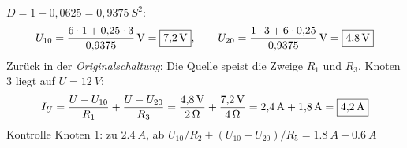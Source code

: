 \documentclass[11pt,a4paper]{article}
\begin{document}
\begin{loesung}
$D = 1 - 0{,}0625 = 0{,}9375\ \si{S^2}$:
\[
  U_{10} = \frac{6\cdot 1 + 0{,}25\cdot 3}{0{,}9375}\,\si{V} = \ergebnis{\SI{7.2}{V}},\qquad
  U_{20} = \frac{1\cdot 3 + 6\cdot 0{,}25}{0{,}9375}\,\si{V} = \ergebnis{\SI{4.8}{V}}
\]
Zurück in der \emph{Originalschaltung}: Die Quelle speist die Zweige $R_1$ und $R_3$, Knoten 3 liegt auf $U = \SI{12}{V}$:
\[
  I_U = \frac{U-U_{10}}{R_1} + \frac{U-U_{20}}{R_3} = \frac{\SI{4.8}{V}}{\SI{2}{\ohm}} + \frac{\SI{7.2}{V}}{\SI{4}{\ohm}} = \SI{2.4}{A}+\SI{1.8}{A} = \ergebnis{\SI{4.2}{A}}
\]
Kontrolle Knoten 1: zu $\SI{2.4}{A}$, ab $U_{10}/R_2 + (U_{10}-U_{20})/R_5 = \SI{1.8}{A}+\SI{0.6}{A}$ \checkmark
{}
\end{loesung}
\end{document}
